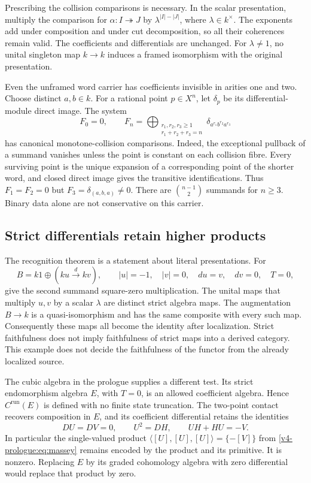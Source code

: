 Prescribing the collision comparisons is necessary.
In the scalar presentation, multiply the comparison
for \(\alpha:I\twoheadrightarrow J\) by
\(\lambda^{|I|-|J|}\), where \(\lambda\in k^\times\).
The exponents add under composition and under cut
decomposition, so all their coherences remain valid.
The coefficients and differentials are unchanged.
For \(\lambda\ne1\), no unital singleton map \(k\to k\)
induces a framed isomorphism with the original presentation.

Even the unframed word carrier has coefficients invisible
in arities one and two. Choose distinct \(a,b\in k\).
For a rational point \(p\in X^n\), let \(\delta_p\)
be its differential-module direct image. The system
\[
 F_0=0,\qquad
 F_n=\bigoplus_{\substack{r_1,r_2,r_3\geq1\\
                          r_1+r_2+r_3=n}}
           \delta_{a^{r_1}b^{r_2}a^{r_3}}
\]
has canonical monotone-collision comparisons. Indeed,
the exceptional pullback of a summand vanishes unless
the point is constant on each collision fibre.
Every surviving point is the unique expansion of a
corresponding point of the shorter word, and closed
direct image gives the transitive identifications.
Thus \(F_1=F_2=0\) but \(F_3=\delta_{(a,b,a)}\ne0\).
There are \(\binom{n-1}{2}\) summands for \(n\geq3\).
Binary data alone are not conservative on this carrier.

\subsection{Strict differentials retain higher products}

The recognition theorem is a statement about literal
presentations. For
\[
 B=k1\oplus(ku\xrightarrow{d}kv),\qquad
 |u|=-1,\quad |v|=0,\quad du=v,\quad dv=0,\quad T=0,
\]
give the second summand square-zero multiplication.
The unital maps that multiply \(u,v\) by a scalar
\(\lambda\) are distinct strict algebra maps.
The augmentation \(B\to k\) is a quasi-isomorphism
and has the same composite with every such map.
Consequently these maps all become the identity after
localization. Strict faithfulness does not imply
faithfulness of strict maps into a derived category.
This example does not decide the faithfulness of the
functor from the already localized source.

The cubic algebra in the prologue supplies a different
test. Its strict endomorphism algebra \(E\), with
\(T=0\), is an allowed coefficient algebra. Hence
\(C^{\mathrm{run}}(E)\) is defined with no finite
state truncation. The two-point contact recovers
composition in \(E\), and its coefficient differential
retains the identities
\[
 DU=DV=0,\qquad U^2=DH,\qquad UH+HU=-V.
\]
In particular the single-valued product
\(\langle[U],[U],[U]\rangle=\{-[V]\}\) from
\eqref{v4-prologue:eq:massey} remains encoded by the
product and its primitive. It is nonzero.
Replacing \(E\) by its graded cohomology algebra with
zero differential would replace that product by zero.

